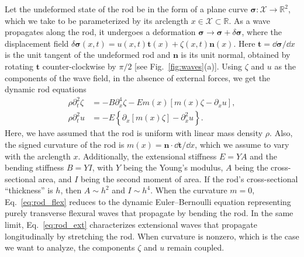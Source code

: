 Let the undeformed state of the rod be in the form of a plane curve $\bm{\sigma}: \mathcal{X} \to \mathbb{R}^{2}$, which we take to be parameterized by its arclength $x \in \mathcal{X} \subset \mathbb{R}$.
As a wave propagates along the rod, it undergoes a deformation $\bm{\sigma} \to \bm{\sigma} + \delta\bm{\sigma}$, where the displacement field $\delta\bm{\sigma}(x,t) = u(x,t)\bm{t}(x) + \zeta(x,t)\bm{n}(x)$.
Here $\bm{t} = \dd\bm{\sigma}/\dd{x}$ is the unit tangent of the undeformed rod and $\bm{n}$ is its unit normal, obtained by rotating $\bm{t}$ counter-clockwise by $\pi/2$ [see Fig.~\ref{fig:waves}(a)].
Using $\zeta$ and $u$ as the components of the wave field, in the absence of external forces, we get the dynamic rod equations~\cite{kernes2021}
%
\begin{subequations}
\begin{align}
  \label{eq:rod_flex}
  \rho\partial_{t}^{2}\zeta &= -B\partial_{x}^{4}\zeta - Em(x)\left[m(x)\zeta - \partial_{x}u\right],\\
  \rho\partial_{t}^{2}u &= -E\left\{\partial_{x}\left[m(x)\zeta\right] - \partial_{x}^{2}u\right\}.
  \label{eq:rod_ext}
\end{align}
\end{subequations}
%
Here, we have assumed that the rod is uniform with linear mass density $\rho$.
Also, the signed curvature of the rod is $m(x) = \bm{n}\cdot\dd\bm{t}/\dd{x}$, which we assume to vary with the arclength $x$.
Additionally, the extensional stiffness $E = YA$ and the bending stiffness $B = YI$, with $Y$ being the Young's modulus, $A$ being the cross-sectional area, and $I$ being the second moment of area.
If the rod's cross-sectional ``thickness'' is $h$, then $A \sim h^2$ and $I \sim h^{4}$.
When the curvature $m = 0$, Eq.~\eqref{eq:rod_flex} reduces to the dynamic Euler--Bernoulli equation representing purely transverse flexural waves that propagate by bending the rod.
In the same limit, Eq.~\eqref{eq:rod_ext} characterizes extensional waves that propagate longitudinally by stretching the rod.
When curvature is nonzero, which is the case we want to analyze, the components $\zeta$ and $u$ remain coupled.

